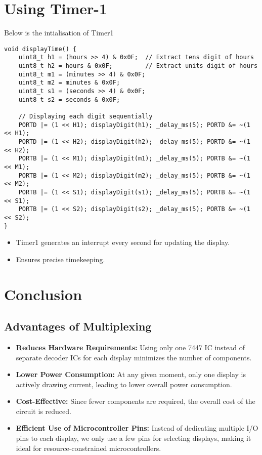 \documentclass[12pt]{article}
\begin{document}
\section{Using Timer-1}
Below is the intialisation of Timer1
\begin{lstlisting}[caption={Multiplexing Logic for 7-Segment Display}, label={lst:multiplexing}]
void displayTime() {
    uint8_t h1 = (hours >> 4) & 0x0F;  // Extract tens digit of hours
    uint8_t h2 = hours & 0x0F;         // Extract units digit of hours
    uint8_t m1 = (minutes >> 4) & 0x0F;
    uint8_t m2 = minutes & 0x0F;
    uint8_t s1 = (seconds >> 4) & 0x0F;
    uint8_t s2 = seconds & 0x0F;

    // Displaying each digit sequentially
    PORTD |= (1 << H1); displayDigit(h1); _delay_ms(5); PORTD &= ~(1 << H1);
    PORTD |= (1 << H2); displayDigit(h2); _delay_ms(5); PORTD &= ~(1 << H2);
    PORTB |= (1 << M1); displayDigit(m1); _delay_ms(5); PORTB &= ~(1 << M1);
    PORTB |= (1 << M2); displayDigit(m2); _delay_ms(5); PORTB &= ~(1 << M2);
    PORTB |= (1 << S1); displayDigit(s1); _delay_ms(5); PORTB &= ~(1 << S1);
    PORTB |= (1 << S2); displayDigit(s2); _delay_ms(5); PORTB &= ~(1 << S2);
}
\end{lstlisting}
\begin{itemize}
    \item Timer1 generates an interrupt every second for updating the display.
    \item Ensures precise timekeeping.
\end{itemize}
\section{Conclusion}

\subsection{Advantages of Multiplexing}
\begin{itemize}
    \item \textbf{Reduces Hardware Requirements:} Using only one 7447 IC instead of separate decoder ICs for each display minimizes the number of components.
    \item \textbf{Lower Power Consumption:} At any given moment, only one display is actively drawing current, leading to lower overall power consumption.
    \item \textbf{Cost-Effective:} Since fewer components are required, the overall cost of the circuit is reduced.
    \item \textbf{Efficient Use of Microcontroller Pins:} Instead of dedicating multiple I/O pins to each display, we only use a few pins for selecting displays, making it ideal for resource-constrained microcontrollers.
\end{itemize}
\end{document}
